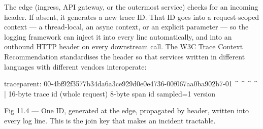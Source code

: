  The edge (ingress, API gateway, or the outermost service) checks for an incoming  header. If absent, it generates a new trace ID. That ID goes into a request-scoped context --- a thread-local, an async context, or an explicit parameter --- so the logging framework can inject it into every line automatically, and into an outbound HTTP header on every downstream call. The W3C Trace Context Recommendation standardises the header so that services written in different languages with different vendors interoperate:

\begin{httpbox}
traceparent: 00-4bf92f3577b34da6a3ce929d0e0e4736-00f067aa0ba902b7-01
             ^   ^                                ^                ^
             |   16-byte trace id (whole request) 8-byte span id   sampled=1
             version
\end{httpbox}

\begin{wbfigure}{Fig 11.4 — One ID, generated at the edge, propagated by header, written into every log line. This is the join key that makes an incident tractable.}
\end{wbfigure}

